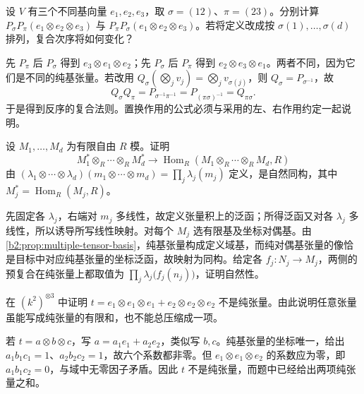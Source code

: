 \begin{exercise}\label{b2:ex:08-permutation-convention}
	设 \(V\) 有三个不同基向量 \(e_1,e_2,e_3\)，取 \(\sigma=(12)\)、\(\pi=(23)\)。分别计算 \(P_\sigma P_\pi(e_1\otimes e_2\otimes e_3)\) 与 \(P_\pi P_\sigma(e_1\otimes e_2\otimes e_3)\)。若将定义改成按 \(\sigma(1),\ldots,\sigma(d)\) 排列，复合次序将如何变化？
\end{exercise}
\begin{solution}
	先 \(P_\pi\) 后 \(P_\sigma\) 得到 \(e_3\otimes e_1\otimes e_2\)；先 \(P_\sigma\) 后 \(P_\pi\) 得到 \(e_2\otimes e_3\otimes e_1\)。两者不同，因为它们是不同的纯基张量。若改用 \(Q_\sigma(\bigotimes_jv_j)=\bigotimes_jv_{\sigma(j)}\)，则 \(Q_\sigma=P_{\sigma^{-1}}\)，故
	\[
		Q_\sigma Q_\pi=P_{\sigma^{-1}\pi^{-1}} =P_{(\pi\sigma)^{-1}}=Q_{\pi\sigma}.
	\]
	于是得到反序的复合法则。置换作用的公式必须与采用的左、右作用约定一起说明。
\end{solution}

\begin{exercise}\label{b2:ex:08-multilinear-dual}
	设 \(M_1,\ldots,M_d\) 为有限自由 \(R\) 模。证明
	\[
		M_1^*\otimes_R\cdots\otimes_RM_d^* \longrightarrow\operatorname{Hom}_R(M_1\otimes_R\cdots\otimes_RM_d,R)
	\]
	由 \((\lambda_1\otimes\cdots\otimes\lambda_d)(m_1\otimes\cdots\otimes m_d)=\prod_j\lambda_j(m_j)\) 定义，是自然同构，其中 \(M_j^*=\operatorname{Hom}_R(M_j,R)\)。
\end{exercise}
\begin{solution}
	先固定各 \(\lambda_j\)，右端对 \(m_j\) 多线性，故定义张量积上的泛函；所得泛函又对各 \(\lambda_j\) 多线性，所以诱导所写线性映射。对每个 \(M_j\) 选有限基及坐标对偶基。由\cref{b2:prop:multiple-tensor-basis}，纯基张量构成定义域基，而纯对偶基张量的像恰是目标中对应纯基张量的坐标泛函，故映射为同构。给定各 \(f_j:N_j\rightarrow M_j\)，两侧的预复合在纯张量上都取值为 \(\prod_j\lambda_j\bigl(f_j(n_j)\bigr)\)，证明自然性。
\end{solution}

\begin{exercise}\label{b2:ex:08-three-tensor-not-pure}
	在 \((k^2)^{\otimes3}\) 中证明 \(t=e_1\otimes e_1\otimes e_1+e_2\otimes e_2\otimes e_2\) 不是纯张量。由此说明任意张量虽能写成纯张量的有限和，也不能总压缩成一项。
\end{exercise}
\begin{solution}
	若 \(t=a\otimes b\otimes c\)，写 \(a=a_1e_1+a_2e_2\)，类似写 \(b,c\)。纯基张量的坐标唯一，给出 \(a_1b_1c_1=1\)、\(a_2b_2c_2=1\)，故六个系数都非零。但 \(e_1\otimes e_1\otimes e_2\) 的系数应为零，即 \(a_1b_1c_2=0\)，与域中无零因子矛盾。因此 \(t\) 不是纯张量，而题中已经给出两项纯张量之和。
\end{solution}

